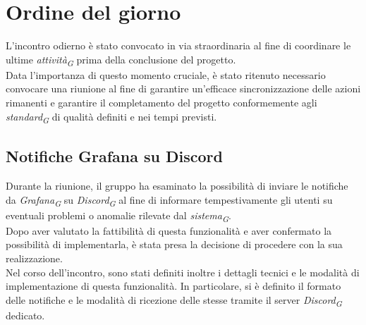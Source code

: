 \documentclass{article}
\begin{document}
\section{Ordine del giorno}
L'incontro odierno è stato convocato in via straordinaria al fine di coordinare le ultime \textit{attività}\textsubscript{\textit{G}} prima della conclusione del progetto. \\
Data l'importanza di questo momento cruciale, è stato ritenuto necessario convocare una riunione al fine di garantire un'efficace sincronizzazione delle azioni rimanenti e garantire il completamento del progetto conformemente agli \textit{standard}\textsubscript{\textit{G}} di qualità definiti e nei tempi previsti.

    \subsection{Notifiche Grafana su Discord}
    Durante la riunione, il gruppo ha esaminato la possibilità di inviare le notifiche da \textit{Grafana}\textsubscript{\textit{G}} su \textit{Discord}\textsubscript{\textit{G}} al fine di informare tempestivamente gli utenti su eventuali problemi o anomalie rilevate dal \textit{sistema}\textsubscript{\textit{G}}. \\
    Dopo aver valutato la fattibilità di questa funzionalità e aver confermato la possibilità di implementarla, è stata presa la decisione di procedere con la sua realizzazione.\\
    Nel corso dell'incontro, sono stati definiti inoltre i dettagli tecnici e le modalità di implementazione di questa funzionalità. In particolare, si è definito il formato delle notifiche e le modalità di ricezione delle stesse tramite il server \textit{Discord}\textsubscript{\textit{G}} dedicato.
\end{document}
